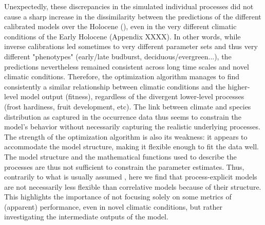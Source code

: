 \documentclass[letterpaper,8pt]{extarticle}  %
\begin{document}
\begin{doublespacing}
\begin{linenumbers}
Unexpectedly, these discrepancies in the simulated individual processes did not cause a sharp increase in the dissimilarity between the predictions of the different calibrated models over the Holocene (), even in the very different climatic conditions of the Early Holocene (Appendix XXXX). In other words, while inverse calibrations led sometimes to very different parameter sets and thus very different "phenotypes" (early/late budburst, deciduous/evergreen...), the predictions nevertheless remained consistent across long time scales and novel climatic conditions. Therefore, the optimization algorithm manages to find consistently a similar relationship between climatic conditions and the higher-level model output (fitness), regardless of the divergent lower-level processes (frost hardiness, fruit development, etc). The link between climate and species distribution as captured in the occurrence data thus seems to constrain the model's behavior without necessarily capturing the realistic underlying processes. The strength of the optimization algorithm is also its weakness: it appears to accommodate the model structure, making it flexible enough to fit the data well. The model structure and the mathematical functions used to describe the processes are thus not sufficient to constrain the parameter estimates. Thus, contrarily to what is usually assumed \cite{Higgins2020}, here we find that process-explicit models are not necessarily less flexible than correlative models because of their structure. This highlights the importance of not focusing solely on some metrics of (apparent) performance, even in novel climatic conditions, but rather investigating the intermediate outputs of the model.


\end{linenumbers}
\end{doublespacing}
\end{document}
